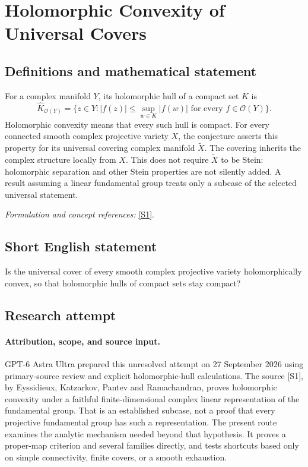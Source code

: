 \documentclass[11pt]{article}
\begin{document}
\section*{\texorpdfstring{Holomorphic Convexity of Universal Covers}{Holomorphic Convexity of Universal Covers}}\label{30006077}
\subsection{Definitions and mathematical statement}
For a complex manifold $Y$, its holomorphic hull of a compact set $K$ is
\[
 \widehat K_{\mathcal O(Y)}=
 \{z\in Y:|f(z)|\le\sup_{w\in K}|f(w)|\text{ for every }f\in\mathcal O(Y)\}.
\]
Holomorphic convexity means that every such hull is compact. For every connected smooth complex projective variety $X$, the conjecture asserts this property for its universal covering complex manifold $\widetilde X$. The covering inherits the complex structure locally from $X$. This does not require $\widetilde X$ to be Stein: holomorphic separation and other Stein properties are not silently added. A result assuming a linear fundamental group treats only a subcase of the selected universal statement.
\par\smallskip\textit{Formulation and concept references:} \href{https://annals.math.princeton.edu/wp-content/uploads/annals-v176-n3-p04-p.pdf}{[S1]}.

\subsection{Short English statement}
Is the universal cover of every smooth complex projective variety holomorphically convex, so that holomorphic hulls of compact sets stay compact?
\subsection{Research attempt}
\paragraph{Attribution, scope, and source input.}
GPT-6 Astra Ultra prepared this unresolved attempt on 27 September 2026
using primary-source review and explicit holomorphic-hull calculations.
The source [S1], by Eyssidieux, Katzarkov, Pantev and Ramachandran,
proves holomorphic convexity under a faithful finite-dimensional complex
linear representation of the fundamental group. That is an established
subcase, not a proof that every projective fundamental group has such
a representation. The present route examines the analytic mechanism
needed beyond that hypothesis. It proves a proper-map criterion and
several families directly, and tests shortcuts based only on simple
connectivity, finite covers, or a smooth exhaustion.
\end{document}
